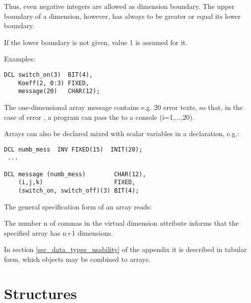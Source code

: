 Thus, even negative integers are allowed as dimension boundary. The
upper boundary of a dimension, however, has always to be greater or
equal its lower boundary.

If the lower boundary is not given, value 1 is assumed for it.


Examples:

\begin{lstlisting}
DCL switch_on(3)  BIT(4),
    Koeff(2, 0:3) FIXED,
    message(20)   CHAR(12);
\end{lstlisting}

The one-dimensional array message contains e.g. 20 error texts, so that,
in the case of error , a program can pass the 
 to a console
(i=1,...,20).

Arrays can also be declared mixed with scalar variables in a declaration,
e.g.:

\begin{lstlisting}
DCL numb_mess  INV FIXED(15)  INIT(20);
 ...

DCL message (numb_mess)        CHAR(12),
    (i,j,k)                    FIXED,
    (switch_on, switch_off)(3) BIT(4);
\end{lstlisting}

The general specification form of an array reads:

\begin{grammarframe}



\end{grammarframe}

The number n of commas in the virtual dimension attribute informs that
the specified array has n+1 dimensions.

In section \ref{sec_data_types_usability} of the appendix it is described
 in tabular form, which objects may be combined to arrays.

\section{Structures}   %
\label{sec_struct}

